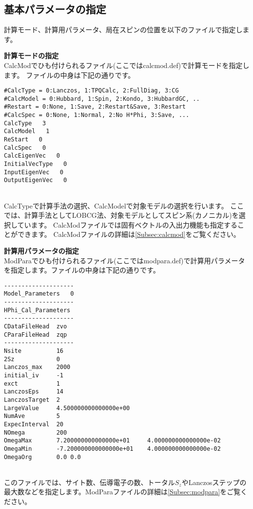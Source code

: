 \subsection{基本パラメータの指定}
計算モード、計算用パラメータ、局在スピンの位置を以下のファイルで指定します。
\begin{description}
\item {\bf 計算モードの指定}\\
  CalcModでひも付けられるファイル(ここではcalcmod.def)で計算モードを指定します。
  ファイルの中身は下記の通りです。\\
\begin{minipage}{15cm}
\begin{screen}
\begin{verbatim}
#CalcType = 0:Lanczos, 1:TPQCalc, 2:FullDiag, 3:CG
#CalcModel = 0:Hubbard, 1:Spin, 2:Kondo, 3:HubbardGC, ..
#Restart = 0:None, 1:Save, 2:Restart&Save, 3:Restart
#CalcSpec = 0:None, 1:Normal, 2:No H*Phi, 3:Save, ...
CalcType   3
CalcModel   1
ReStart   0
CalcSpec   0
CalcEigenVec   0
InitialVecType   0
InputEigenVec   0
OutputEigenVec   0
\end{verbatim}
\end{screen}
\end{minipage}
~\\
CalcTypeで計算手法の選択、CalcModelで対象モデルの選択を行います。
ここでは、計算手法としてLOBCG法、対象モデルとしてスピン系(カノニカル)を選択しています。
{CalcModファイルでは固有ベクトルの入出力機能も指定することができます。}
CalcModファイルの詳細は\ref{Subsec:calcmod}をご覧ください。\\

\item {\bf 計算用パラメータの指定}\\
ModParaでひも付けられるファイル(ここではmodpara.def)で計算用パラメータを指定します。ファイルの中身は下記の通りです。\\
\begin{minipage}{15cm}
\begin{screen}
\begin{verbatim}
--------------------
Model_Parameters   0
--------------------
HPhi_Cal_Parameters
--------------------
CDataFileHead  zvo
CParaFileHead  zqp
--------------------
Nsite          16   
2Sz            0    
Lanczos_max    2000 
initial_iv     -1   
exct           1    
LanczosEps     14   
LanczosTarget  2    
LargeValue     4.500000000000000e+00    
NumAve         5    
ExpecInterval  20   
NOmega         200  
OmegaMax       7.200000000000000e+01     4.000000000000000e-02    
OmegaMin       -7.200000000000000e+01    4.000000000000000e-02    
OmegaOrg       0.0 0.0
\end{verbatim}
\end{screen}
\end{minipage}
~\\
このファイルでは、サイト数、{伝導電子の数、トータル$S_z$}やLanczosステップの最大数などを指定します。ModParaファイルの詳細は\ref{Subsec:modpara}をご覧ください。\\


\end{description}
